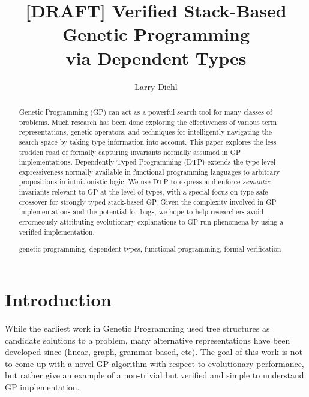 \documentclass[runningheads,a4paper]{llncs}
\newcommand{\keywords}[1]{\par\addvspace\baselineskip
\noindent\keywordname\enspace\ignorespaces#1}
\begin{document}
\mainmatter  %

\title{[DRAFT] Verified Stack-Based Genetic Programming\\
via Dependent Types}

\author{Larry Diehl}


\maketitle
\begin{abstract}
Genetic Programming (GP) can act as a powerful search tool for many
classes of problems. Much research has been done exploring the
effectiveness of  various term representations, genetic operators, and
techniques for intelligently navigating the search space by taking
type information into account. This paper explores the less trodden
road of formally capturing invariants normally assumed in GP
implementations. Dependently Typed Programming (DTP) extends the
type-level expressiveness normally available in functional programming
languages to arbitrary propositions in intuitionistic logic. We use
DTP to express and enforce \textit{semantic} invariants relevant to GP
at the level of types, with a special focus on type-safe crossover for
strongly typed stack-based GP. Given the complexity involved in GP
implementations and the potential for bugs, we hope to help
researchers avoid errorneously attributing evolutionary explanations
to GP run phenomena by using a verified implementation. 
\keywords{genetic programming, dependent types, functional
  programming, formal verification}
\end{abstract}

\section{Introduction}

While the earliest work in Genetic Programming used tree structures as
candidate solutions to a problem, many alternative representations
have been developed since (linear, graph, grammar-based, etc). The
goal of this work is not to come up with a novel GP algorithm with
respect to evolutionary performance, but rather give an example of a
non-trivial but verified and simple to understand GP implementation.
\end{document}

